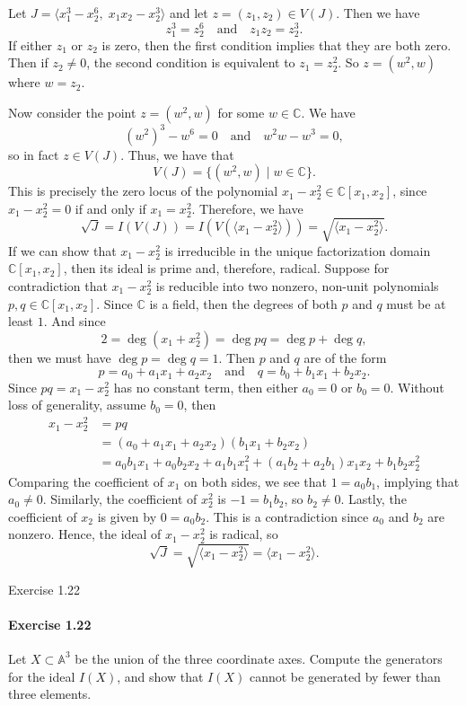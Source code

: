 \documentclass[12pt]{article}
\newenvironment{fullbox}{\begin{lrbox}{\savefullbox}\begin{minipage}{\dimexpr\textwidth-2\fboxsep\relax}}{\end{minipage}\end{lrbox}\begin{center}\framebox[\textwidth]{\usebox{\savefullbox}}\end{center}}
\newenvironment{pbox}[1][]{\begin{fullbox}\ifx#1\empty\else\paragraph{#1}\fi}{\end{fullbox}}
\theoremstyle{definition}
\newcommand{\isp}[1]{\quad\text{#1}\quad}
\newcommand{\C}{\mathbb{C}}
\newcommand{\<}{\langle}
\renewcommand{\>}{\rangle}
\newcommand{\A}{\mathbb{A}}
\newcommand{\rad}{\sqrt}
\begin{document}
Let $J = \<x_1^3 - x_2^6,\; x_1x_2 - x_2^3\>$ and let $z = (z_1, z_2) \in V(J)$. Then we have
\[
    z_1^3 = z_2^6 \isp{and} z_1z_2 = z_2^3.
\]
If either $z_1$ or $z_2$ is zero, then the first condition implies that they are both zero. Then if $z_2 \ne 0$, the second condition is equivalent to $z_1 = z_2^2$. So $z = (w^2, w)$ where $w = z_2$.

Now consider the point $z = (w^2, w)$ for some $w \in \C$. We have
\[
    (w^2)^3 - w^6 = 0 \isp{and} w^2w - w^3 = 0,
\]
so in fact $z \in V(J)$. Thus, we have that
\[
    V(J) = \{(w^2, w) \mid w \in \C\}.
\]
This is precisely the zero locus of the polynomial $x_1 - x_2^2 \in \C[x_1, x_2]$, since $x_1 - x_2^2 = 0$ if and only if $x_1 = x_2^2$. Therefore, we have
\[
    \rad{J} = I(V(J)) = I(V(\<x_1 - x_2^2\>)) = \rad{\<x_1 - x_2^2\>}.
\]
If we can show that $x_1 - x_2^2$ is irreducible in the unique factorization domain $\C[x_1, x_2]$, then its ideal is prime and, therefore, radical. Suppose for contradiction that $x_1 - x_2^2$ is reducible into two nonzero, non-unit polynomials $p, q \in \C[x_1, x_2]$. Since $\C$ is a field, then the degrees of both $p$ and $q$ must be at least $1$. And since
\[
    2 = \deg(x_1 + x_2^2) = \deg pq = \deg p + \deg q,
\]
then we must have $\deg p = \deg q = 1$. Then $p$ and $q$ are of the form
\[
    p = a_0 + a_1 x_1 + a_2 x_2 \isp{and} q = b_0 + b_1 x_1 + b_2 x_2.
\]
Since $pq = x_1 - x_2^2$ has no constant term, then either $a_0 = 0$ or $b_0 = 0$. Without loss of generality, assume $b_0 = 0$, then
\begin{align*}
    x_1 - x_2^2
        &= pq \\
        &= (a_0 + a_1 x_1 + a_2 x_2)(b_1 x_1 + b_2 x_2) \\
        &= a_0b_1x_1 + a_0b_2x_2 + a_1b_1x_1^2 + (a_1b_2 + a_2b_1)x_1x_2 + b_1b_2x_2^2
\end{align*}
Comparing the coefficient of $x_1$ on both sides, we see that $1 = a_0b_1$, implying that $a_0 \ne 0$. Similarly, the coefficient of $x_2^2$ is $-1 = b_1b_2$, so $b_2 \ne 0$. Lastly, the coefficient of $x_2$ is given by $0 = a_0b_2$. This is a contradiction since $a_0$ and $b_2$ are nonzero. Hence, the ideal of $x_1 - x_2^2$ is radical, so
\[
    \rad{J} = \rad{\<x_1 - x_2^2\>} = \<x_1 - x_2^2\>.
\]




\begin{pbox}[Exercise 1.22]
    Let $X \subset \A^3$ be the union of the three coordinate axes. Compute the generators for the ideal $I(X)$, and show that $I(X)$ cannot be generated by fewer than three elements.
\end{pbox}
\end{document}
